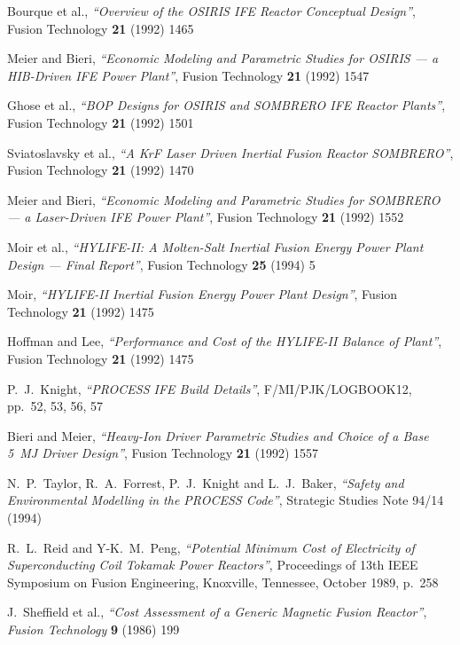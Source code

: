\begin{thebibliography}{99}
Bourque et al.,
\textit{``Overview of the OSIRIS IFE Reactor Conceptual Design''},
Fusion Technology \textbf{21} (1992) 1465

Meier and Bieri,
\textit{``Economic Modeling and Parametric Studies for OSIRIS --- a HIB-Driven
  IFE Power Plant''},
Fusion Technology \textbf{21} (1992) 1547

Ghose et al.,
\textit{``BOP Designs for OSIRIS and SOMBRERO IFE Reactor Plants''},
Fusion Technology \textbf{21} (1992) 1501

Sviatoslavsky et al.,
\textit{``A KrF Laser Driven Inertial Fusion Reactor SOMBRERO''},
Fusion Technology \textbf{21} (1992) 1470

Meier and Bieri,
\textit{``Economic Modeling and Parametric Studies for SOMBRERO --- a Laser-Driven
  IFE Power Plant''},
Fusion Technology \textbf{21} (1992) 1552

Moir et al.,
\textit{``HYLIFE-II: A Molten-Salt Inertial Fusion Energy Power Plant Design
  --- Final Report''},
Fusion Technology \textbf{25} (1994) 5

Moir,
\textit{``HYLIFE-II Inertial Fusion Energy Power Plant Design''},
Fusion Technology \textbf{21} (1992) 1475

Hoffman and Lee,
\textit{``Performance and Cost of the HYLIFE-II Balance of Plant''},
Fusion Technology \textbf{21} (1992) 1475

P.\ J.\ Knight,
\textit{``PROCESS IFE Build Details''},
F/MI/PJK/LOGBOOK12, pp.\ 52, 53, 56, 57

Bieri and Meier,
\textit{``Heavy-Ion Driver Parametric Studies and Choice of a Base 5~MJ Driver
  Design''},
Fusion Technology \textbf{21} (1992) 1557

N.\ P.\ Taylor, R.\ A.\ Forrest, P.\ J.\ Knight and L.\ J.\ Baker,
\textit{``Safety and Environmental Modelling in the PROCESS Code''},
Strategic Studies Note 94/14 (1994)

R.\ L.\ Reid and Y-K.\ M.\ Peng,
\textit{``Potential Minimum Cost of Electricity of Superconducting Coil
Tokamak Power Reactors''},
Proceedings of 13th IEEE Symposium on Fusion Engineering, Knoxville,
Tennessee, October 1989, p.\ 258

J.\ Sheffield et al.,
\textit{``Cost Assessment of a Generic Magnetic Fusion Reactor''},
\textit{Fusion Technology} \textbf{9} (1986) 199


\end{thebibliography}

